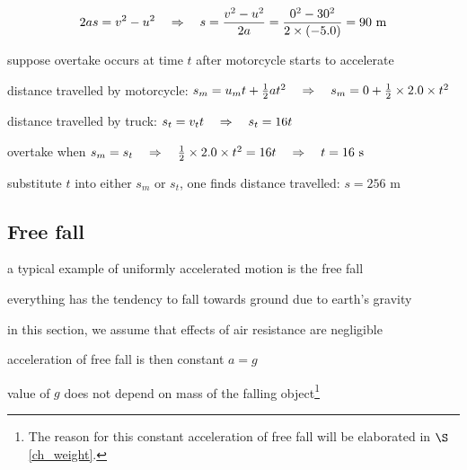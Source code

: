 \begin{soln}
\begin{equation*}
2as=v^2-u^2 \quad \Rightarrow \quad s = \frac{v^2-u^2}{2a} = \frac{0^2 - 30^2}{2\times(-5.0)} = 90 \text{ m} 
\end{equation*}
\end{soln}


\begin{soln} suppose overtake occurs at time $t$ after motorcycle starts to accelerate

distance travelled by motorcycle: $s_m = u_mt + \frac{1}{2}at^2  \quad \Rightarrow \quad s_m = 0 + \frac{1}{2}\times 2.0 \times t^2$

distance travelled by truck: $s_t = v_t t \quad \Rightarrow \quad s_t = 16t$

overtake when $s_m = s_t \quad \Rightarrow \quad \frac{1}{2}\times 2.0 \times t^2 = 16 t \quad \Rightarrow \quad t=16 \text{ s}$

substitute $t$ into either $s_m$ or $s_t$, one finds distance travelled: $s = 256 \text{ m}$ 
\end{soln}




\subsection{Free fall}\label{ch_freefall}

a typical example of uniformly accelerated motion is the free fall

everything has the tendency to fall towards ground due to earth's gravity

in this section, we assume that effects of air resistance are negligible

acceleration of free fall is then constant $a=g$

value of $g$ does not depend on mass of the falling object\footnote{The reason for this constant acceleration of free fall will be elaborated in $\S$\ref{ch_weight}.}

